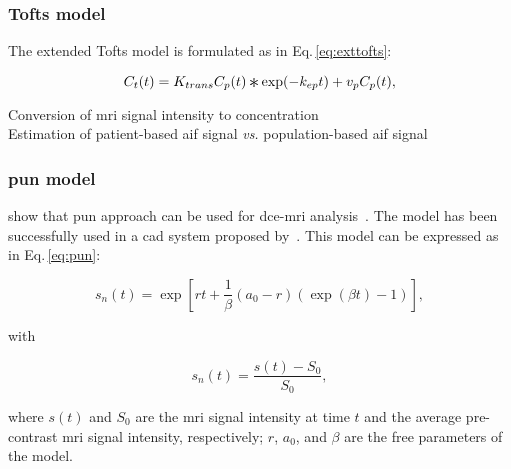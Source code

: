 \subsubsection{Tofts model}

The extended Tofts model is formulated as in Eq.\,\eqref{eq:exttofts}:

\begin{equation}
  C_t(t) = K_{trans} C_p(t) \Conv \exp(-k_{ep}t) + v_p C_p(t),
  \label{eq:exttofts}
\end{equation}

\begin{description}
  \item[Conversion of \ac{mri} signal intensity to concentration]

  \item[Estimation of patient-based \ac{aif} signal \textit{vs.} population-based \ac{aif} signal]
\end{description}

\subsubsection{\acs*{pun} model}

\citeauthor{gliozzi2011phenomenological} show that \ac{pun} approach can be used for \ac{dce}-\ac{mri} analysis~\citep{gliozzi2011phenomenological}.
The model has been successfully used in a \ac{cad} system proposed by~\cite{giannini2015fully}.
This model can be expressed as in Eq.\,\eqref{eq:pun}:

\begin{equation}
  s_n(t) = \exp\left[rt + \frac{1}{\beta} \left( a_0 - r \right) \left( \exp(\beta t) - 1 \right) \right],
  \label{eq:pun}
\end{equation}

\noindent with

\begin{equation}
  s_n(t) = \frac{s(t) - S_0}{S_0},
  \label{eq:enh}
\end{equation}

\noindent where $s(t)$ and $S_0$ are the \ac{mri} signal intensity at time $t$ and the average pre-contrast \ac{mri} signal intensity, respectively; $r$, $a_0$, and $\beta$ are the free parameters of the model.

\subsubsection{}

